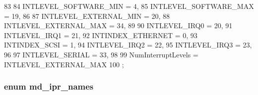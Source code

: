 \begin{DoxyCode}
83 {
84     INTLEVEL_SOFTWARE_MIN = 4,
85     INTLEVEL_SOFTWARE_MAX = 19,
86 
87     INTLEVEL_EXTERNAL_MIN = 20,
88     INTLEVEL_EXTERNAL_MAX = 34,
89 
90     INTLEVEL_IRQ0 = 20,
91     INTLEVEL_IRQ1 = 21,
92     INTINDEX_ETHERNET = 0,
93     INTINDEX_SCSI = 1,
94     INTLEVEL_IRQ2 = 22,
95     INTLEVEL_IRQ3 = 23,
96 
97     INTLEVEL_SERIAL = 33,
98 
99     NumInterruptLevels = INTLEVEL_EXTERNAL_MAX
100 };
\end{DoxyCode}
\hypertarget{namespaceAlphaISA_a0cd208652efde0d49b6a875aea151470}{
\subsubsection[{md\_\-ipr\_\-names}]{\setlength{\rightskip}{0pt plus 5cm}enum {\bf md\_\-ipr\_\-names}}}
\label{namespaceAlphaISA_a0cd208652efde0d49b6a875aea151470}
